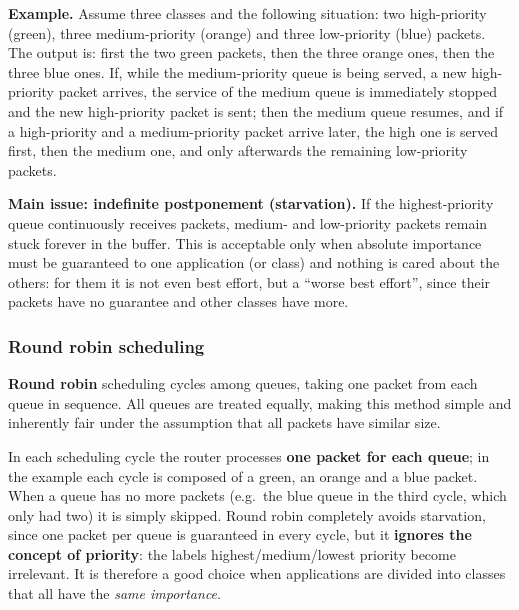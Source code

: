 \textbf{Example.} Assume three classes and the following situation: two high-priority (green), three medium-priority (orange) and three low-priority (blue) packets. The output is: first the two green packets, then the three orange ones, then the three blue ones. If, while the medium-priority queue is being served, a new high-priority packet arrives, the service of the medium queue is immediately stopped and the new high-priority packet is sent; then the medium queue resumes, and if a high-priority and a medium-priority packet arrive later, the high one is served first, then the medium one, and only afterwards the remaining low-priority packets.

\textbf{Main issue: indefinite postponement (starvation).} If the highest-priority queue continuously receives packets, medium- and low-priority packets remain stuck forever in the buffer. This is acceptable only when absolute importance must be guaranteed to one application (or class) and nothing is cared about the others: for them it is not even best effort, but a ``worse best effort'', since their packets have no guarantee and other classes have more.

\subsubsection*{Round robin scheduling}

\textbf{Round robin} scheduling cycles among queues, taking one packet from each queue in sequence. All queues are treated equally, making this method simple and inherently fair under the assumption that all packets have similar size.

\begin{center}
\end{center}

In each scheduling cycle the router processes \textbf{one packet for each queue}; in the example each cycle is composed of a green, an orange and a blue packet. When a queue has no more packets (e.g.\ the blue queue in the third cycle, which only had two) it is simply skipped. Round robin completely avoids starvation, since one packet per queue is guaranteed in every cycle, but it \textbf{ignores the concept of priority}: the labels highest/medium/lowest priority become irrelevant. It is therefore a good choice when applications are divided into classes that all have the \emph{same importance}.

